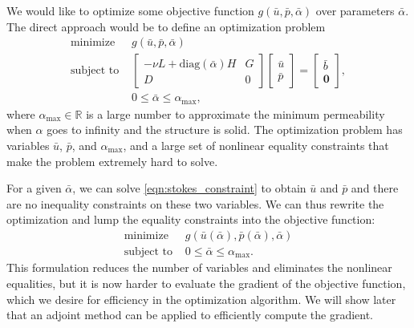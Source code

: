 \documentclass[times]{fldauth}
\begin{document}
We would like to optimize some objective function
$g(\bar{u},\bar{p},\bar{\alpha})$ over parameters $\bar{\alpha}$. The
direct approach would be to define an optimization problem
\begin{subequations}
\begin{align}
  \text{minimize } &g(\bar{u},\bar{p},\bar{\alpha}) \\
  \label{eqn:stokes_constraint}
  \text{subject to } &\begin{bmatrix} -\nu L + \text{diag} (\bar{\alpha}) H
       & G \\ D & 0
    \end{bmatrix}
    \begin{bmatrix}
      \bar{u} \\ \bar{p}
    \end{bmatrix} =
    \begin{bmatrix}
     \bar{b} \\ \mathbf{0}
    \end{bmatrix}, \\
    &0 \le \bar{\alpha} \le \alpha_{\text{max}},
\end{align}
\end{subequations}
where $\alpha_{\text{max}}\in \mathbb{R}$ is a large number to
approximate the minimum permeability when $\alpha$ goes to infinity
and the structure is solid. The optimization problem has variables
$\bar{u}$, $\bar{p}$, and $\alpha_{\text{max}}$, and a large set of
nonlinear equality constraints that make the problem extremely hard to
solve.

For a given $\bar{\alpha}$, we can solve \eqref{eqn:stokes_constraint}
to obtain $\bar{u}$ and $\bar{p}$ and there are no inequality
constraints on these two variables. We can thus rewrite the
optimization and lump the equality constraints into the objective
function:
\begin{subequations}
  \label{topoptform}
  \begin{align}
    \label{topoptform_cost}
    \text{minimize } &g(\bar{u}(\bar{\alpha}),
    \bar{p}(\bar{\alpha}), \bar{\alpha}) \\
    \label{topoptform_constraint}
    \text{subject to } &0\le \bar{\alpha} \le \alpha_\text{max}.
  \end{align}
\end{subequations}
This formulation reduces the number of variables and eliminates the
nonlinear equalities, but it is now harder to evaluate the gradient of
the objective function, which we desire for efficiency in the
optimization algorithm. We will show later that an adjoint method can
be applied to efficiently compute the gradient.
\end{document}
